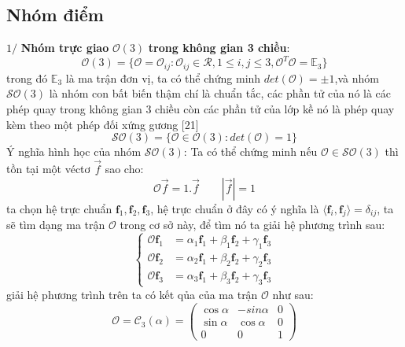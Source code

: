   \subsection{Nhóm điểm}
  $1/$ \textbf{Nhóm trực giao} $\mathcal{O}(3)$ \textbf{trong không gian 3 chiều}:
  \begin{equation}
  \mathcal{O}(3) = \{\mathcal{O}=\mathcal{O}_{ij}:\mathcal{O}_{ij}\in\mathcal{R},1\leq i,j\leq 3 ,\mathcal{O}^T\mathcal{O}=\mathbb{E}_3\}
  \end{equation}
  trong đó $\mathbb{E}_3$ là ma trận đơn vị, ta có thể chứng minh $det(\mathcal{O})=\pm1$,và nhóm $\mathcal{SO}(3)$ là nhóm con bất biến thậm chí là chuẩn tắc, các phần tử của nó là các phép quay trong không gian 3 chiều còn các phần tử của lớp kề nó là phép quay kèm theo một phép đối xứng gương [21]
  \begin{equation}
  \mathcal{SO}(3) = \{\mathcal{O}\in\mathcal{O}(3):det(\mathcal{O})=1\}
  \end{equation}
  Ý nghĩa hình học của nhóm $\mathcal{SO}(3)$: Ta có thể chứng minh nếu $\mathcal{O}\in\mathcal{SO}(3)$ thì tồn tại một véctơ $\vec{f}$ sao cho:
  \begin{equation}
  \mathcal{O}\vec{f}=1.\vec{f} \qquad |\vec{f}|=1
  \end{equation}
  ta chọn hệ trực chuẩn $\mathbf{f}_1,\mathbf{f}_2,\mathbf{f}_3$, hệ trực chuẩn ở đây có ý nghĩa là $\langle \mathbf{f}_i,\mathbf{f}_j\rangle=\delta_{ij}$, ta sẽ tìm dạng ma trận $\mathcal{O}$ trong cơ sở này, để tìm nó ta giải hệ phương trình sau:
  \begin{equation}
  \begin{cases} 
  \mathcal{O}\mathbf{f}_1 &=\alpha_1\mathbf{f}_1 +\beta_1\mathbf{f}_2 +\gamma_1\mathbf{f}_3 \\
   \mathcal{O}\mathbf{f}_2 &=\alpha_2\mathbf{f}_1 +\beta_2\mathbf{f}_2 +\gamma_2\mathbf{f}_3  \\
   \mathcal{O}\mathbf{f}_3 &=\alpha_3\mathbf{f}_1 +\beta_3\mathbf{f}_2 +\gamma_3\mathbf{f}_3 
   \end{cases} 
   \end{equation}
  giải hệ phương trình trên ta có kết qủa của ma trận $\mathcal{O}$ như sau:
  \begin{equation}
  \mathcal{O}=\mathcal{C}_3(\alpha)=\begin{pmatrix}
  \cos\alpha &-sin\alpha & 0\\
  \sin\alpha &\cos\alpha &0\\
  0 &0 &1
  \end{pmatrix}
  \end{equation}

